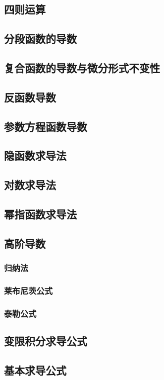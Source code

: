 \documentclass[UTF8]{ctexart}
\begin{document}
\subsection{四则运算}
\subsection{分段函数的导数}
\subsection{复合函数的导数与微分形式不变性}
\subsection{反函数导数}
\subsection{参数方程函数导数}
\subsection{隐函数求导法}
\subsection{对数求导法}
\subsection{幂指函数求导法}
\subsection{高阶导数}
\subsubsection{归纳法}
\subsubsection{莱布尼茨公式}
\subsubsection{泰勒公式}
\subsection{变限积分求导公式}
\subsection{基本求导公式}
\end{document}
